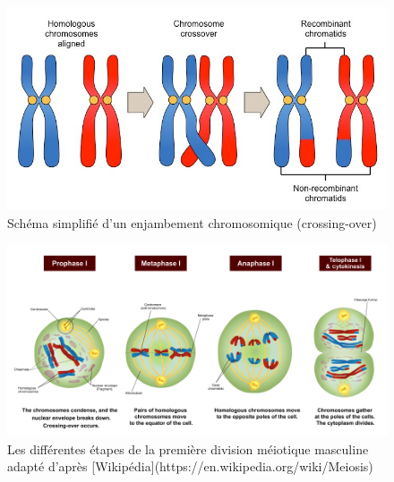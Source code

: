 \documentclass[12pt,twoside]{ugathesis}
\theoremstyle{definition}
\theoremstyle{definition}
\theoremstyle{remark}
\begin{document}
\begin{figure}

{\centering \includegraphics[scale=0.35]{figure/crossingover} 

}

\caption{Schéma simplifié d'un enjambement chromosomique (crossing-over)}\label{fig:crossingover}
\end{figure}

\newpage 

\begin{figure}

{\centering \includegraphics[scale=0.43]{figure/MeiosisI} 

}

\caption[Les différentes étapes de la première division méiotique masculine adapté]{Les différentes étapes de la première division méiotique masculine adapté d'après [Wikipédia](https://en.wikipedia.org/wiki/Meiosis)}\label{fig:meiosei}
\end{figure}
\end{document}
